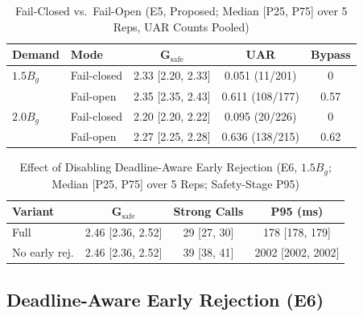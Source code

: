 \documentclass[conference]{IEEEtran}
\newcommand{\Gsafe}{G_{\mathrm{safe}}}
\newcommand{\Bg}{B_g}
\begin{document}
\begin{table}[t]
\caption{Fail-Closed vs.\ Fail-Open (E5, Proposed; Median [P25, P75] over 5 Reps, UAR Counts Pooled)}
\label{tab:e5}
\centering
\footnotesize
\setlength{\tabcolsep}{3pt}
\begin{tabular}{llccc}
\toprule
\textbf{Demand} & \textbf{Mode} & $\boldsymbol{\Gsafe}$ & \textbf{UAR} & \textbf{Bypass} \\
\midrule
$1.5\Bg$ & Fail-closed & 2.33 [2.20, 2.33] & 0.051 (11/201) & 0 \\
         & Fail-open   & 2.35 [2.35, 2.43] & 0.611 (108/177) & 0.57 \\
$2.0\Bg$ & Fail-closed & 2.20 [2.20, 2.22] & 0.095 (20/226) & 0 \\
         & Fail-open   & 2.27 [2.25, 2.28] & 0.636 (138/215) & 0.62 \\
\bottomrule
\end{tabular}
\end{table}

\begin{table}[t]
\caption{Effect of Disabling Deadline-Aware Early Rejection (E6, $1.5\Bg$; Median [P25, P75] over 5 Reps; Safety-Stage P95)}
\label{tab:e6}
\centering
\footnotesize
\setlength{\tabcolsep}{3pt}
\begin{tabular}{lccc}
\toprule
\textbf{Variant} & $\boldsymbol{\Gsafe}$ & \textbf{Strong Calls} & \textbf{P95 (ms)} \\
\midrule
Full & 2.46 [2.36, 2.52] & 29 [27, 30] & 178 [178, 179] \\
No early rej. & 2.46 [2.36, 2.52] & 39 [38, 41] & 2002 [2002, 2002] \\
\bottomrule
\end{tabular}
\end{table}

\subsection{Deadline-Aware Early Rejection (E6)}
\end{document}
